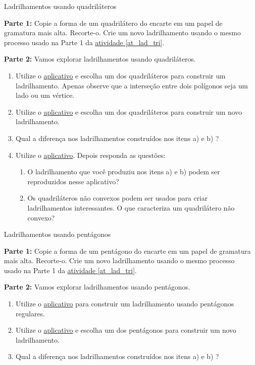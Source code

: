 \begin{task}{Ladrilhamentos usando quadriláteros} \label{lad_qua}

\textbf{Parte 1:} Copie a forma de um quadrilátero do encarte em um papel de gramatura mais alta. Recorte-o. Crie um novo ladrilhamento usando o mesmo processo usado na Parte 1 da \hyperref[at_lad_tri]{atividade \ref{at_lad_tri}}. 

\textbf{Parte 2:} Vamos explorar  ladrilhamentos  usando quadriláteros. 
\begin{enumerate}

\item Utilize o \href{https://www.geogebra.org/m/d6nvffqk}{aplicativo} e escolha um dos quadriláteros para construir um ladrilhamento. Apenas observe que a interseção entre dois polígonos seja um lado ou um vértice.
\item Utilize o \href{https://www.geogebra.org/m/mdybnpnq}{aplicativo} e escolha um dos quadriláteros para construir um novo ladrilhamento.
\item Qual a diferença nos ladrilhamentos construídos nos itens a) e b) ?
\item Utilize o \href{https://www.geogebra.org/m/ejfw44rt}{aplicativo}. Depois responda as questões:
\begin{enumerate}
\item O ladrilhamento que você produziu nos itens a) e b) podem ser reproduzidos nesse aplicativo?
\item Os quadriláteros não convexos podem ser usados para criar ladrilhamentos interessantes. O que caracteriza um quadrilátero não convexo?
\end{enumerate}

\end{enumerate}

\end{task}


\begin{task}{Ladrilhamentos usando pentágonos}\label{lad_pen}

\textbf{Parte 1:} Copie a forma de  um pentágono do encarte em um papel de gramatura mais alta. Recorte-o. Crie um novo ladrilhamento usando o mesmo processo usado na Parte 1 da \hyperref[at_lad_tri]{atividade \ref{at_lad_tri}}. 

\textbf{Parte 2:} Vamos explorar  ladrilhamentos  usando pentágonos. 
\begin{enumerate}

\item Utilize o \href{https://www.geogebra.org/m/exzjd4mh}{aplicativo} para construir um ladrilhamento usando pentágonos regulares.
\item Utilize o  \href{https://www.geogebra.org/m/sffzzsww}{aplicativo}  e escolha um dos pentágonos para construir um novo ladrilhamento.
\item Qual a diferença nos ladrilhamentos construídos nos itens a) e b) ?
\end{enumerate}
\end{task}

